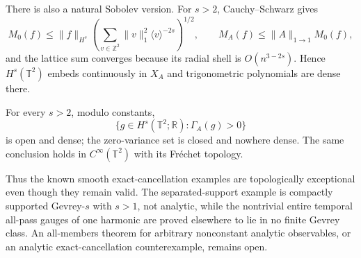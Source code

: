 There is also a natural Sobolev version.  For $s>2$, Cauchy--Schwarz gives
\[
 M_0(f)\leq\|f\|_{H^s}
 \left(\sum_{v\in\mathbb Z^2}\|v\|_1^2\langle v\rangle^{-2s}\right)^{1/2},
 \qquad M_A(f)\leq\|A\|_{1\to1}M_0(f),
\]
and the lattice sum converges because its radial shell is
$O(n^{3-2s})$.  Hence $H^s(\mathbb T^2)$ embeds continuously in $X_A$ and
trigonometric polynomials are dense there.

\begin{corollary}
For every $s>2$, modulo constants,
\[
 \{g\in H^s(\mathbb T^2;\mathbb R):\Gamma_A(g)>0\}
\]
is open and dense; the zero-variance set is closed and nowhere dense.  The
same conclusion holds in $C^\infty(\mathbb T^2)$ with its Fr\'echet topology.
\end{corollary}

Thus the known smooth exact-cancellation examples are topologically
exceptional even though they remain valid.  The separated-support example is
compactly supported Gevrey-$s$ with $s>1$, not analytic, while the nontrivial
entire temporal all-pass gauges of one harmonic are proved elsewhere to lie
in no finite Gevrey class.  An all-members theorem for arbitrary nonconstant
analytic observables, or an analytic exact-cancellation counterexample,
remains open.
